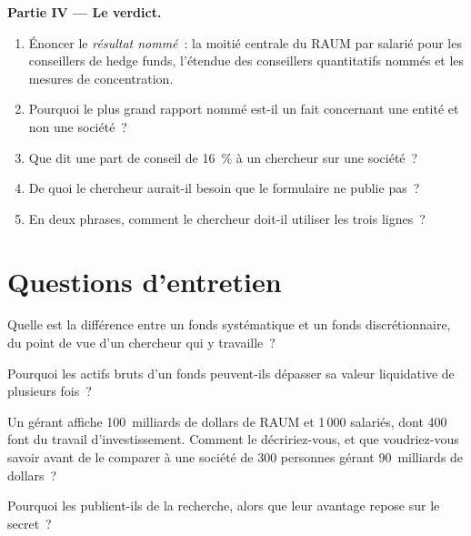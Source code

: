 \begin{problem}
\medskip\noindent\textbf{Partie IV --- Le verdict.}
\begin{enumerate}[resume]
\item Énoncer le \emph{résultat nommé}~: la moitié centrale du RAUM par salarié pour les conseillers de hedge funds, l'étendue des
conseillers quantitatifs nommés et les mesures de concentration.
\item Pourquoi le plus grand rapport nommé est-il un fait concernant une entité et non une société~?
\item Que dit une part de conseil de 16~\% à un chercheur sur une société~?
\item De quoi le chercheur aurait-il besoin que le formulaire ne publie pas~?
\item En deux phrases, comment le chercheur doit-il utiliser les trois lignes~?
\end{enumerate}
\end{problem}

\section{Questions d'entretien}

\begin{interviewq}\label{iq:in:quantitative-hedge-funds-and-systematic-managers:1}
Quelle est la différence entre un fonds systématique et un fonds discrétionnaire, du point de vue
d'un chercheur qui y travaille~?
\end{interviewq}

\begin{interviewq}\label{iq:in:quantitative-hedge-funds-and-systematic-managers:2}
Pourquoi les actifs bruts d'un fonds peuvent-ils dépasser sa valeur liquidative de plusieurs fois~?
\end{interviewq}

\begin{interviewq}\label{iq:in:quantitative-hedge-funds-and-systematic-managers:3}
Un gérant affiche 100~milliards de dollars de RAUM et 1\,000 salariés, dont 400 font du travail d'investissement. Comment le décririez-vous, et
que voudriez-vous savoir avant de le comparer à une société de 300 personnes gérant 90~milliards de dollars~?
\end{interviewq}

\begin{interviewq}\label{iq:in:quantitative-hedge-funds-and-systematic-managers:4}
Pourquoi les  publient-ils de la recherche, alors que leur avantage repose sur le secret~?
\end{interviewq}

